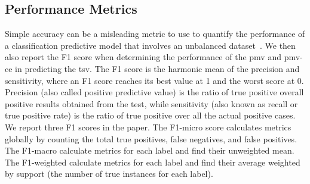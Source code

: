 %

\subsection{Performance Metrics}\label{subsec:performance-metrics}
Simple accuracy can be a misleading metric to use to quantify the performance of a classification predictive model that involves an unbalanced dataset~\cite{Chawla2005}.
We then also report the F1 score when determining the performance of the \ac{pmv} and \ac{pmv-ce} in predicting the \ac{tsv}.
The F1 score is the harmonic mean of the precision and sensitivity, where an F1 score reaches its best value at 1 and the worst score at 0.
Precision (also called positive predictive value) is the ratio of true positive overall positive results obtained from the test, while sensitivity (also known as recall or true positive rate) is the ratio of true positive over all the actual positive cases.
We report three F1 scores in the paper.
The F1-micro score calculates metrics globally by counting the total true positives, false negatives, and false positives.
The F1-macro calculate metrics for each label and find their unweighted mean.
The F1-weighted calculate metrics for each label and find their average weighted by support (the number of true instances for each label).

